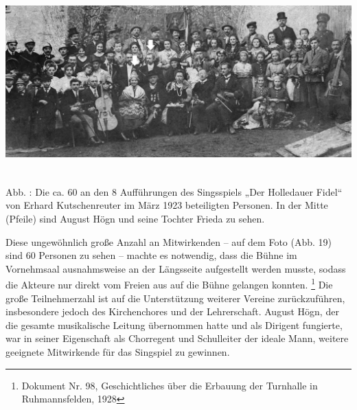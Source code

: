 \includegraphics[width=15.993cm,height=7.015cm]{pictures/zulassungsarbeit-img021.jpg}


\label{bkm:Ref100050511}Abb. : Die ca. 60 an
den 8 Aufführungen des Singsspiels „Der Holledauer Fidel“ von Erhard
Kutschenreuter im März 1923 beteiligten Personen. In der Mitte (Pfeile)
sind August Högn und seine Tochter Frieda zu sehen.

Diese ungewöhnlich große Anzahl an Mitwirkenden – auf dem Foto (Abb. 19)
sind 60 Personen zu sehen – machte es notwendig, dass die Bühne im
Vornehmsaal ausnahmsweise an der Längsseite aufgestellt werden musste,
sodass die Akteure nur direkt vom Freien aus auf die Bühne gelangen
konnten. \footnote{Dokument Nr. 98, Geschichtliches über die Erbauung
der Turnhalle in Ruhmannsfelden, 1928} Die große Teilnehmerzahl ist auf
die Unterstützung weiterer Vereine zurückzuführen, insbesondere jedoch
des Kirchenchores und der Lehrerschaft. August Högn, der die gesamte
musikalische Leitung übernommen hatte und als Dirigent fungierte, war
in seiner Eigenschaft als Chorregent und Schulleiter der ideale Mann,
weitere geeignete Mitwirkende für das Singspiel zu gewinnen.

